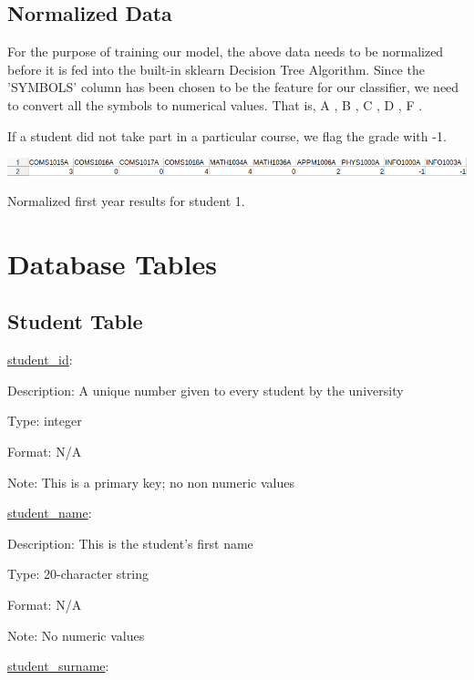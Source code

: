 \documentclass[10pt]{article}
\begin{document}
\subsection{Normalized Data}

For the purpose of training our model, the above data needs to be normalized before it is fed into the built-in sklearn Decision Tree Algorithm. Since the 'SYMBOLS' column has been chosen to be the feature for our classifier, we need to convert all the symbols to numerical values. That is, A  , B  , C , D , F .

If a student did not take part in a particular course, we flag the grade with -1.

\begin{center}
\includegraphics[width=1.0\textwidth]{normalized_features.png}
\end{center}
\caption{Normalized first year results for student 1.}

\section{Database Tables}

\subsection{Student Table}


\underline{student\_id}:

\begin{description}[font=$\bullet$~\normalfont\scshape\color{red!50!black}]
\item [] Description: A unique number given to every student by the university
\item [] Type: integer
\item [] Format: N/A
\item [] Note: This is a primary key; no non numeric values
    
\end{description}
\underline{student\_name}:
 
 
\begin{description}[font=$\bullet$~\normalfont\scshape\color{red!50!black}]
\item [] Description: This is the student’s first name
\item [] Type: 20-character string
\item [] Format: N/A
\item [] Note: No numeric values
\end{description}
\underline{student\_surname}:
\end{document}
